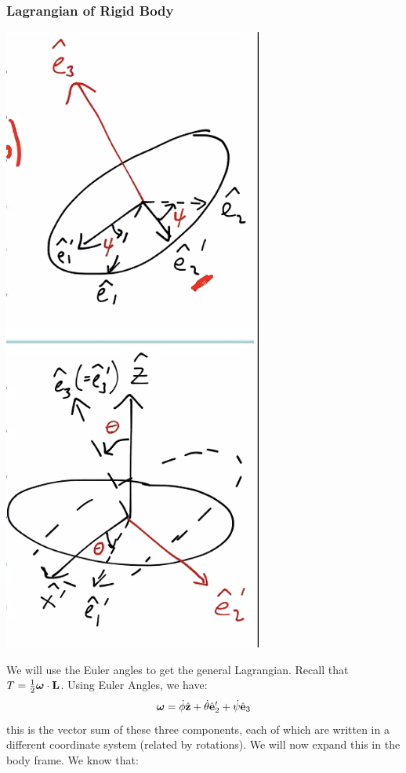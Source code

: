 \documentclass[../PHYS306Notes.tex]{subfiles}
\begin{document}
\subsubsection{Lagrangian of Rigid Body}
\begin{center}
    \includegraphics[scale=0.5]{Lecture-21/l21-img1.png}
\end{center}
We will use the Euler angles to get the general Lagrangian. Recall that $T = \frac{1}{2}\bm{\omega}\cdot\mathbf{L}$. Using Euler Angles, we have:
\[\bm{\omega} = \dot{\phi}\hat{\mathbf{z}} + \dot{\theta}\hat{\mathbf{e}}_2' + \dot{\psi}\hat{\mathbf{e}}_3\]
this is the vector sum of these three components, each of which are written in a different coordinate system (related by rotations). We will now expand this in the body frame. We know that:
\end{document}
